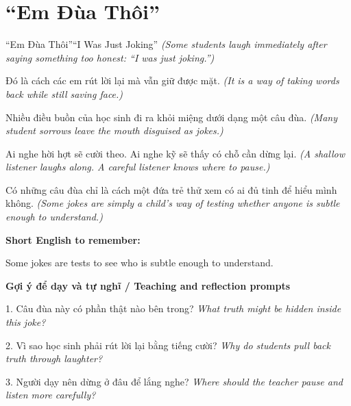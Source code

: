\section{“Em Đùa Thôi”}
\begin{truyen}{“Em Đùa Thôi”}{“I Was Just Joking”}
\textit{(Some students laugh immediately after saying something too honest: “I was just joking.”)}

Đó là cách các em rút lời lại mà vẫn giữ được mặt.
\textit{(It is a way of taking words back while still saving face.)}

Nhiều điều buồn của học sinh đi ra khỏi miệng dưới dạng một câu đùa.
\textit{(Many student sorrows leave the mouth disguised as jokes.)}

Ai nghe hời hợt sẽ cười theo. Ai nghe kỹ sẽ thấy có chỗ cần dừng lại.
\textit{(A shallow listener laughs along. A careful listener knows where to pause.)}

\end{truyen}

\begin{baihoc}
Có những câu đùa chỉ là cách một đứa trẻ thử xem có ai đủ tinh để hiểu mình không.
\textit{(Some jokes are simply a child’s way of testing whether anyone is subtle enough to understand.)}
\end{baihoc}

\begin{ghinhoanh}
\textbf{Short English to remember:}

Some jokes are tests to see who is subtle enough to understand.

\end{ghinhoanh}

\begin{tuhocnhanh}
\textbf{Gợi ý để dạy và tự nghĩ / Teaching and reflection prompts}

1. Câu đùa này có phần thật nào bên trong? \textit{What truth might be hidden inside this joke?}

2. Vì sao học sinh phải rút lời lại bằng tiếng cười? \textit{Why do students pull back truth through laughter?}

3. Người dạy nên dừng ở đâu để lắng nghe? \textit{Where should the teacher pause and listen more carefully?}
\end{tuhocnhanh}
\ngancach


